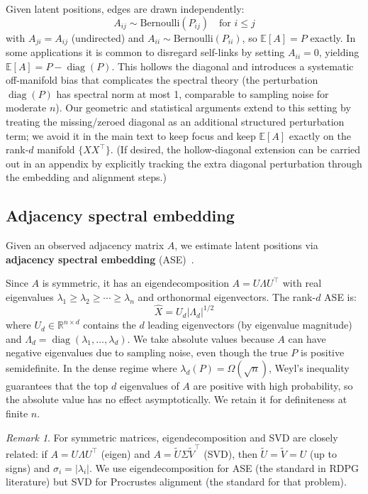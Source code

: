 \documentclass{article}
\newcommand{\RR}{\mathbb{R}}
\newcommand{\EE}{\mathbb{E}}
\DeclareMathOperator{\diag}{diag}
\theoremstyle{plain}
\theoremstyle{definition}
\theoremstyle{remark}
\newtheorem*{remark}{Remark}
\begin{document}
Given latent positions, edges are drawn independently:
\begin{equation}
A_{ij} \sim \text{Bernoulli}(P_{ij}) \quad \text{for } i \le j
\end{equation}
with $A_{ji} = A_{ij}$ (undirected) and $A_{ii} \sim \text{Bernoulli}(P_{ii})$, so $\EE[A] = P$ exactly.
In some applications it is common to disregard self-links by setting $A_{ii} = 0$, yielding $\EE[A] = P - \diag(P)$.
This hollows the diagonal and introduces a systematic off-manifold bias that complicates the spectral theory (the perturbation $\diag(P)$ has spectral norm at most 1, comparable to sampling noise for moderate $n$).
Our geometric and statistical arguments extend to this setting by treating the missing/zeroed diagonal as an additional structured perturbation term; we avoid it in the main text to keep focus and keep $\EE[A]$ exactly on the rank-$d$ manifold $\{XX^\top\}$.
(If desired, the hollow-diagonal extension can be carried out in an appendix by explicitly tracking the extra diagonal perturbation through the embedding and alignment steps.)

\subsection{Adjacency spectral embedding}\label{sec:ase}

Given an observed adjacency matrix $A$, we estimate latent positions via \textbf{adjacency spectral embedding} (ASE)~\citep{athreya2017statistical}.

Since $A$ is symmetric, it has an eigendecomposition $A = U \Lambda U^\top$ with real eigenvalues $\lambda_1 \ge \lambda_2 \ge \cdots \ge \lambda_n$ and orthonormal eigenvectors.
The rank-$d$ ASE is:
\begin{equation}
\hat{X} = U_d |\Lambda_d|^{1/2}
\end{equation}
where $U_d \in \RR^{n \times d}$ contains the $d$ leading eigenvectors (by eigenvalue magnitude) and $\Lambda_d = \diag(\lambda_1, \ldots, \lambda_d)$.
We take absolute values because $A$ can have negative eigenvalues due to sampling noise, even though the true $P$ is positive semidefinite.
In the dense regime where $\lambda_d(P) = \Omega(\sqrt{n})$, Weyl's inequality guarantees that the top $d$ eigenvalues of $A$ are positive with high probability, so the absolute value has no effect asymptotically.
We retain it for definiteness at finite $n$.

\begin{remark}
For symmetric matrices, eigendecomposition and SVD are closely related: if $A = U \Lambda U^\top$ (eigen) and $A = \tilde{U} \Sigma \tilde{V}^\top$ (SVD), then $\tilde{U} = \tilde{V} = U$ (up to signs) and $\sigma_i = |\lambda_i|$.
We use eigendecomposition for ASE (the standard in RDPG literature) but SVD for Procrustes alignment (the standard for that problem).
\end{remark}
\end{document}
